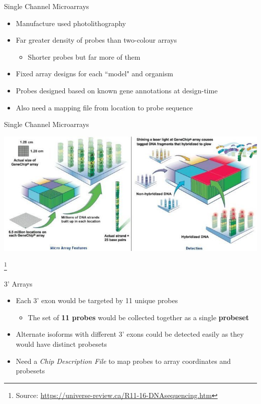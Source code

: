 \documentclass[aspectratio=169,11pt]{beamer}
\newcommand\blfootnote[1]{%
  \begingroup
  \renewcommand\thefootnote{}\footnote{#1}%
  \addtocounter{footnote}{-1}%
  \endgroup
}
\begin{document}
\begin{frame}{Single Channel Microarrays}

	\begin{itemize}
		\item Manufacture used photolithography
		\item Far greater density of probes than two-colour arrays
		\begin{itemize}
			\item Shorter probes but far more of them
		\end{itemize}
		\item Fixed array designs for each ``model" and organism
		\item Probes designed based on known gene annotations at design-time 
		\item Also need a mapping file from location to probe sequence
	\end{itemize}

\end{frame}

\begin{frame}{Single Channel Microarrays}

	\begin{center}
	\includegraphics[scale=0.4]{figures/microarrayLayout.jpg} 
	\end{center}
	
	\blfootnote{Source: \url{https://universe-review.ca/R11-16-DNAsequencing.htm}}

\end{frame}

\begin{frame}{3’ Arrays}

	\begin{itemize}
		\item Each 3' exon would be targeted by 11 unique probes
		\begin{itemize}
			\item The set of \textbf{11 probes} would be collected together as a single \textbf{probeset}
		\end{itemize}
		\item Alternate isoforms with different 3' exons could be detected easily as they would have distinct probesets
		\item Need a \textit{Chip Description File} to map probes to array coordinates and probesets
	\end{itemize}


\end{frame}
\end{document}

